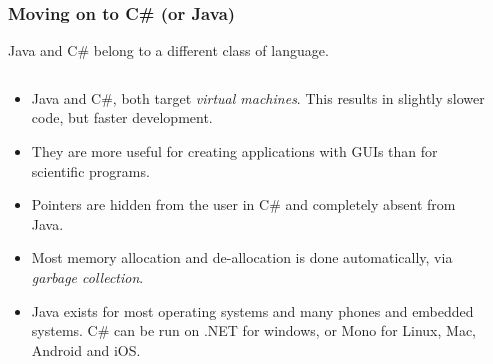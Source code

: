 \documentclass[smaller,handout,table]{beamer}
\begin{document}
\begin{frame}
\frametitle{Moving on to C\# (or Java)}
Java and C\# belong to a different class of language.
\begin{columns}
\begin{column}{0.66\textwidth}
\begin{itemize}
\item Java and C\#, both target \emph{virtual machines}. This results in slightly slower code, but faster development.
\item They are more useful for creating applications with GUIs than for scientific programs.
\item Pointers are hidden from the user in C\# and completely absent from Java.
\item Most memory allocation and de-allocation is done automatically, via \emph{garbage collection}.
\item Java exists for most operating systems and many phones and embedded systems. C\# can be run on .NET for windows, or Mono for Linux, Mac, Android and iOS.
\end{itemize}
\end{column}
\begin{column}{0.7\textwidth}
\hspace{-0.57in}
\end{column}
\end{columns}
\end{frame}
\end{document}
